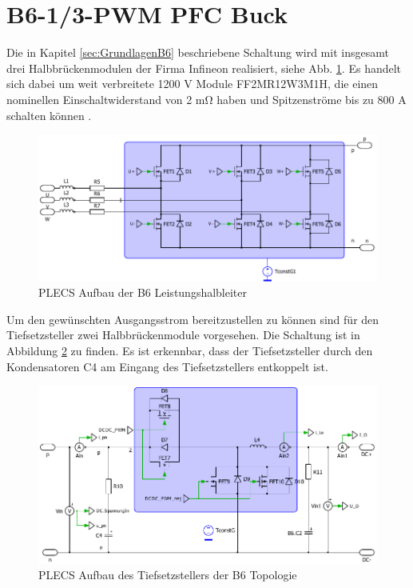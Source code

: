 	

\section{B6-1/3-PWM PFC Buck}
Die in Kapitel \ref{sec:GrundlagenB6} beschriebene Schaltung wird mit insgesamt drei Halbbrückenmodulen der Firma Infineon realisiert, siehe Abb. \ref{fig:plecsb6}. Es handelt sich dabei um weit verbreitete 1200 \si{\volt} Module FF2MR12W3M1H, die einen nominellen Einschaltwiderstand von 2 \si{\milli \ohm} haben und Spitzenströme bis zu 800 \si{\ampere} schalten können \cite{IFAGFF2}.
\begin{figure}[H]
	\centering
	\includegraphics[width=1\linewidth]{content/Grafiken/PLECS_B6}
	\caption{PLECS Aufbau der B6 Leistungshalbleiter}
	\label{fig:plecsb6}
\end{figure}
 Um den gewünschten Ausgangsstrom bereitzustellen zu können sind für den Tiefsetzsteller zwei Halbbrückenmodule vorgesehen. Die Schaltung ist in Abbildung \ref{fig:plecsb6buck} zu finden. Es ist erkennbar, dass der Tiefsetzsteller durch den Kondensatoren C4 am Eingang des Tiefsetzstellers entkoppelt ist.
 \begin{figure}[H]
 	\centering
 	\includegraphics[width=0.9\linewidth]{content/Grafiken/PLECS_B6Buck}
 	\caption{PLECS Aufbau des Tiefsetzstellers der B6 Topologie}
 	\label{fig:plecsb6buck}
 \end{figure}
 

